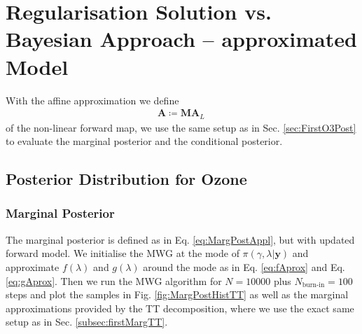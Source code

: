 \section{Regularisation Solution vs. Bayesian Approach -- approximated Model}
With the affine approximation we define
\begin{align}
	\bm{A}  \coloneqq \bm{M A}_L \, 
\end{align}
of the non-linear forward map, we use the same setup as in Sec. \ref{sec:FirstO3Post} to evaluate the marginal posterior and the conditional posterior.
\subsection{Posterior Distribution for Ozone}

\subsubsection{Marginal Posterior}
The marginal posterior is defined as in Eq. \ref{eq:MargPostAppl}, but with updated forward model.
We initialise the MWG at the mode of $\pi(\gamma, \lambda | \bm{y})$ and approximate $f(\lambda)$ and $g(\lambda)$ around the mode as in Eq. \ref{eq:fAprox} and Eq. \ref{eq:gAprox}.
Then we run the MWG algorithm for $N = 10000$ plus $N_{\text{burn-in}} = 100$ steps and plot the samples in Fig. \ref{fig:MargPostHistTT} as well as the marginal approximations provided by the TT decomposition, where we use the exact same setup as in Sec. \ref{subsec:firstMargTT}.

